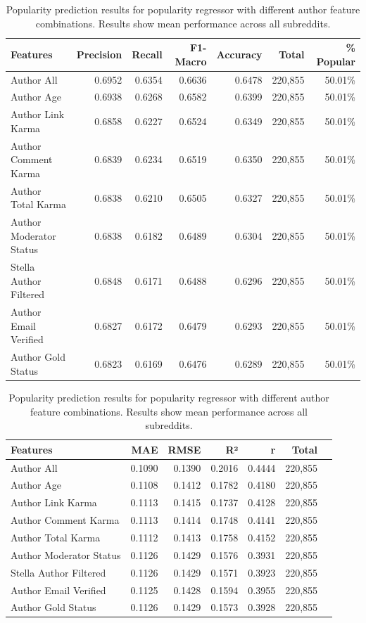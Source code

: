 \begin{table}[ht]
\centering
\caption{Popularity prediction results for popularity regressor with different author feature combinations. Results show mean performance across all subreddits.}
\label{tab:author_comparison}
\begin{tabular}{lrrrrrr}
\toprule
Features & Precision & Recall & F1-Macro & Accuracy & Total & \% Popular \\
\midrule
Author All & 0.6952 & 0.6354 & 0.6636 & 0.6478 & 220,855 & 50.01\% \\
Author Age & 0.6938 & 0.6268 & 0.6582 & 0.6399 & 220,855 & 50.01\% \\
Author Link Karma & 0.6858 & 0.6227 & 0.6524 & 0.6349 & 220,855 & 50.01\% \\
Author Comment Karma & 0.6839 & 0.6234 & 0.6519 & 0.6350 & 220,855 & 50.01\% \\
Author Total Karma & 0.6838 & 0.6210 & 0.6505 & 0.6327 & 220,855 & 50.01\% \\
Author Moderator Status & 0.6838 & 0.6182 & 0.6489 & 0.6304 & 220,855 & 50.01\% \\
Stella Author Filtered & 0.6848 & 0.6171 & 0.6488 & 0.6296 & 220,855 & 50.01\% \\
Author Email Verified & 0.6827 & 0.6172 & 0.6479 & 0.6293 & 220,855 & 50.01\% \\
Author Gold Status & 0.6823 & 0.6169 & 0.6476 & 0.6289 & 220,855 & 50.01\% \\
\bottomrule
\end{tabular}
\end{table}

\begin{table}[ht]
\centering
\caption{Popularity prediction results for popularity regressor with different author feature combinations. Results show mean performance across all subreddits.}
\label{tab:author_comparison}
\begin{tabular}{lrrrrrr}
\toprule
Features & MAE & RMSE & R² & r & Total \\
\midrule
Author All & 0.1090 & 0.1390 & 0.2016 & 0.4444 & 220,855 \\
Author Age & 0.1108 & 0.1412 & 0.1782 & 0.4180 & 220,855 \\
Author Link Karma & 0.1113 & 0.1415 & 0.1737 & 0.4128 & 220,855 \\
Author Comment Karma & 0.1113 & 0.1414 & 0.1748 & 0.4141 & 220,855 \\
Author Total Karma & 0.1112 & 0.1413 & 0.1758 & 0.4152 & 220,855 \\
Author Moderator Status & 0.1126 & 0.1429 & 0.1576 & 0.3931 & 220,855 \\
Stella Author Filtered & 0.1126 & 0.1429 & 0.1571 & 0.3923 & 220,855 \\
Author Email Verified & 0.1125 & 0.1428 & 0.1594 & 0.3955 & 220,855 \\
Author Gold Status & 0.1126 & 0.1429 & 0.1573 & 0.3928 & 220,855 \\
\bottomrule
\end{tabular}
\end{table}

